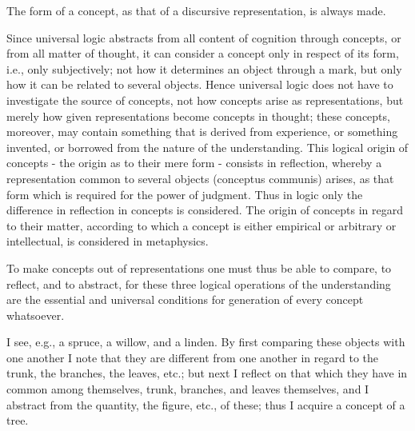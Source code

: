     The form of a concept, as that of a discursive representation, is always made.

    Since universal logic abstracts from all content of cognition through concepts,
    or from all matter of thought, it can consider a concept only in
    respect of its form, i.e., only subjectively;
    not how it determines an object through a mark,
    but only how it can be related to several objects.
    Hence universal logic does not have to investigate the source of concepts,
    not how concepts arise as representations,
    but merely how given representations become concepts in thought;
    these concepts, moreover, may contain something that is derived from experience,
    or something invented, or borrowed from the nature of the understanding.
    This logical origin of concepts - the origin as to their mere form -
    consists in reflection, whereby a representation common to several objects
    (conceptus communis) arises, as that form which is required for the power of judgment.
    Thus in logic only the difference in reflection in concepts is considered.
    The origin of concepts in regard to their matter,
    according to which a concept is either empirical or arbitrary or intellectual,
    is considered in metaphysics.

    To make concepts out of representations one must thus be able
    to compare, to reflect, and to abstract,
    for these three logical operations of the understanding are the essential and
    universal conditions for generation of every concept whatsoever.

    I see, e.g., a spruce, a willow, and a linden.
    By first comparing these objects with one another I note that they are different
    from one another in regard to the trunk, the branches, the leaves, etc.;
    but next I reflect on that which they have in common among themselves,
    trunk, branches, and leaves themselves, and I abstract from the quantity,
    the figure, etc., of these; thus I acquire a concept of a tree.

